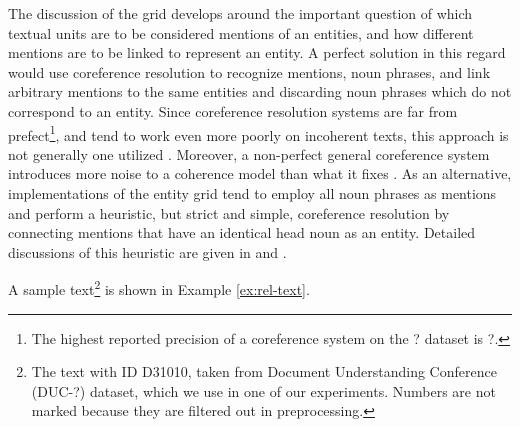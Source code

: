 The discussion of the grid develops around the important question of which textual units are to be considered mentions of an entities, and how different mentions are to be linked to represent an entity. 
A perfect solution in this regard would use coreference resolution to recognize mentions, noun phrases, and link arbitrary mentions to the same entities and discarding noun phrases which do not correspond to an entity. 
Since coreference resolution systems are far from prefect\footnote{The highest reported precision of a coreference system on the ? dataset is ?.}, and tend to work even more poorly on incoherent texts, this approach is not generally one utilized \cite{barzilay05a}. 
Moreover, a non-perfect general coreference system introduces more noise to a coherence model than what it fixes \cite{barzilay08}.  
As an alternative, implementations of the entity grid tend to employ all noun phrases as mentions and perform a heuristic, but strict and simple, coreference resolution by connecting mentions that have an identical head noun as an entity. 
Detailed discussions of this heuristic are given in  and .

A sample text\footnote{The text with ID D31010, taken from Document Understanding Conference (DUC-?) dataset, which we use in one of our experiments. Numbers are not marked because they are filtered out in preprocessing.} is shown in Example \ref{ex:rel-text}. 


